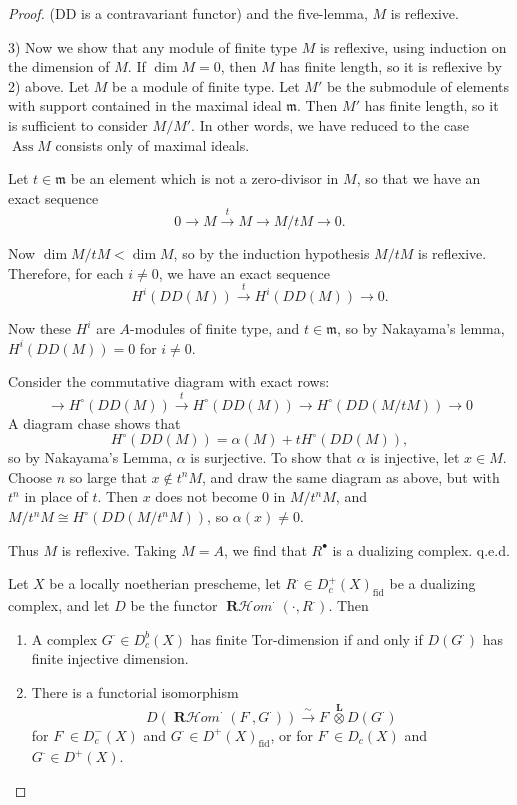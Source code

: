 \documentclass[12pt]{book}
\DeclareMathOperator{\RHom}{\mathbf{R}\mathcal{H}\textit{om}}
\begin{document}
\begin{proof}
\setcounter{page}{262}
(DD is a contravariant functor) and the five-lemma, \(M\) is reflexive.

3) Now we show that any module of finite type \(M\) is reflexive, using induction on the dimension of \(M\). If \(\dim M=0\), then \(M\) has finite length, so it is reflexive by 2) above. Let \(M\) be a module of finite type. Let \(M'\) be the submodule of elements with support contained in the maximal ideal \(\mathfrak{m}\). Then \(M'\) has finite length, so it is sufficient to consider \(M / M'\). In other words, we have reduced to the case \(\operatorname{Ass} M\) consists only of maximal ideals.

Let \(t \in \mathfrak{m}\) be an element which is not a zero-divisor in \(M\), so that we have an exact sequence
\[
0 \to M \stackrel{t}{\to} M \to M / tM \to 0 .
\]

Now \(\dim M / tM < \dim M\), so by the induction hypothesis \(M / tM\) is reflexive. Therefore, for each \(i \neq 0\), we have an exact sequence
\[
H^{i}(DD(M)) \stackrel{t}{\to} H^{i}(DD(M)) \to 0 .
\]

Now these \(H^{i}\) are \(A\)-modules of finite type, and \(t \in \mathfrak{m}\), so by Nakayama's lemma, \(H^{i}(DD(M))=0\) for \(i \neq 0\).

\setcounter{page}{263}
Consider the commutative diagram with exact rows:
\[
\to H^{\circ}(DD(M)) \stackrel{t}{\to} H^{\circ}(DD(M)) \to H^{\circ}(DD(M/tM)) \to 0
\]
A diagram chase shows that
\[
H^{\circ}(DD(M))=\alpha(M)+tH^{\circ}(DD(M)),
\]
so by Nakayama's Lemma, \(\alpha\) is surjective. To show that \(\alpha\) is injective, let \(x \in M\). Choose \(n\) so large that \(x \notin t^{n} M\), and draw the same diagram as above, but with \(t^{n}\) in place of \(t\). Then \(x\) does not become \(0\) in \(M / t^{n} M\), and \(M / t^{n} M \cong H^{\circ}(DD(M/t^{n} M))\), so \(\alpha(x) \neq 0\).

Thus \(M\) is reflexive. Taking \(M=A\), we find that \(R^{\bullet}\) is a dualizing complex. q.e.d.

\begin{proposition}
Let \(X\) be a locally noetherian prescheme, let \(R^{\cdot} \in D_{c}^{+}(X)_{\text{fid}}\) be a dualizing complex, and let \(D\) be the functor \(\RHom^{\cdot}(\cdot, R^{\cdot})\). Then
\begin{enumerate}
\item[a).] A complex \(G^{\cdot} \in D_{c}^{b}(X)\) has finite Tor-dimension if and only if \(D(G^{\cdot})\) has finite injective dimension.
\item[b).] There is a functorial isomorphism
\[
D\left(\RHom^{\cdot}\left(F^{\cdot}, G^{\cdot}\right)\right) \stackrel{\sim}{\to} F^{\cdot} \stackrel{\mathbf{L}}{\otimes} D\left(G^{\cdot}\right)
\]
for \(F^{\cdot} \in D_{c}^{-}(X)\) and \(G^{\cdot} \in D^{+}(X)_{\text{fid}}\), or for \(F^{\cdot} \in D_{c}(X)\) and \(G^{\cdot} \in D^{+}(X)\).
\end{enumerate}


\end{proposition}
\end{proof}
\end{document}
